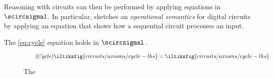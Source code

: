 Reasoning with circuits can then be performed by applying equations in
\(\scircsigmal\).
In particular, \cite{ghica2022compositional} sketches an
\emph{operational semantics} for digital circuits by applying an equation
that shows how a sequential circuit processes an input.

\begin{theorem}
    The \eqref{eq:cycle} equation holds in \(\scircsigmal\).
\end{theorem}

\begin{figure*}
    \centering
    \begin{equation*}
        \tag{\(\mathsf{Cycle}\)}
        \iltikzfig{circuits/axioms/cycle-lhs}
        =
        \iltikzfig{circuits/axioms/cycle-lhs}
        \label{eq:cycle}
    \end{equation*}
    \caption{The }
\end{figure*}